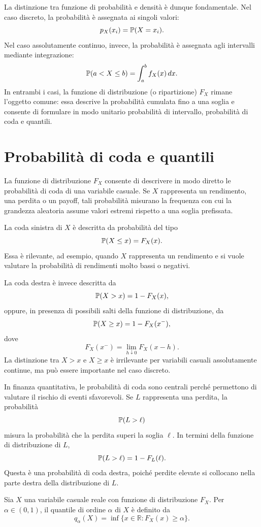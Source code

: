 La distinzione tra funzione di probabilit\`{a} e densit\`{a} \`{e} dunque fondamentale. Nel
caso discreto, la probabilit\`{a} \`{e} assegnata ai singoli valori:
\[
p_X(x_i)=\mathbb{P}(X=x_i).
\]
Nel caso assolutamente continuo, invece, la probabilit\`{a} \`{e} assegnata agli
intervalli mediante integrazione:
\[
\mathbb{P}(a<X\leq b)
=
\int_a^b f_X(x)\,dx.
\]
In entrambi i casi, la funzione di distribuzione (o ripartizione) $F_X$ rimane l'oggetto comune:
essa descrive la probabilit\`{a} cumulata fino a una soglia e consente di
formulare in modo unitario probabilit\`{a} di intervallo, probabilit\`{a} di coda
e quantili.

\section{Probabilit\`{a} di coda e quantili}
\label{sec:cap2-code-quantili}

La funzione di distribuzione $F_X$ consente di descrivere in modo diretto le
probabilit\`{a} di coda di una variabile casuale. Se $X$ rappresenta un
rendimento, una perdita o un payoff, tali probabilit\`{a} misurano la frequenza
con cui la grandezza aleatoria assume valori estremi rispetto a una soglia
prefissata.

La coda sinistra di $X$ \`{e} descritta da probabilit\`{a} del tipo
\[
\mathbb{P}(X\leq x)=F_X(x).
\]
Essa \`{e} rilevante, ad esempio, quando $X$ rappresenta un rendimento e si vuole
valutare la probabilit\`{a} di rendimenti molto bassi o negativi.

La coda destra \`{e} invece descritta da
\[
\mathbb{P}(X>x)=1-F_X(x),
\]
oppure, in presenza di possibili salti della funzione di distribuzione, da
\[
\mathbb{P}(X\geq x)=1-F_X(x^-),
\]
dove
\[
F_X(x^-)=\lim_{h\downarrow 0}F_X(x-h).
\]
La distinzione tra $X>x$ e $X\geq x$ \`{e} irrilevante per variabili casuali
assolutamente continue, ma pu\`{o} essere importante nel caso discreto.

In finanza quantitativa, le probabilit\`{a} di coda sono centrali perch\'{e}
permettono di valutare il rischio di eventi sfavorevoli. Se $L$ rappresenta una
perdita, la probabilit\`{a}
\[
\mathbb{P}(L>\ell)
\]
misura la probabilit\`{a} che la perdita superi la soglia $\ell$. In termini della
funzione di distribuzione di $L$,
\[
\mathbb{P}(L>\ell)=1-F_L(\ell).
\]
Questa \`{e} una probabilit\`{a} di coda destra, poich\'{e} perdite elevate si
collocano nella parte destra della distribuzione di $L$.

\begin{definition}[Quantile]
Sia $X$ una variabile casuale reale con funzione di distribuzione $F_X$. Per
$\alpha\in(0,1)$, il quantile di ordine $\alpha$ di $X$ \`{e} definito da
\[
q_\alpha(X)
=
\inf\{x\in\mathbb{R}:F_X(x)\geq \alpha\}.
\]
\end{definition}

